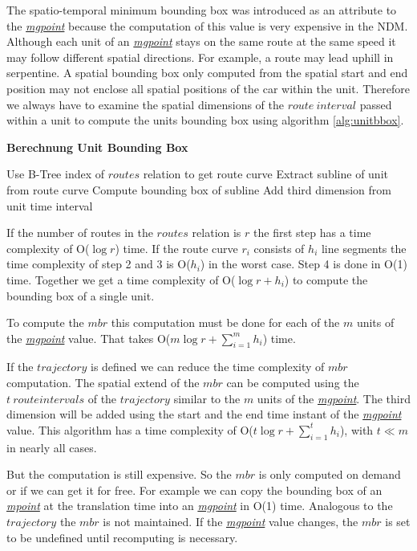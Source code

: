 \documentclass[a4paper]{article}
\newcommand{\op}[1]{\textbf{#1}}
\newcommand{\dt}[1]{\textsl{\underline{#1}}}
\begin{document}
The spatio-temporal minimum bounding box was introduced as an attribute to the
\dt{mgpoint} because the computation of this value is very expensive in the
NDM. Although each unit of an \dt{mgpoint} stays on the same route
at the same speed it may follow different spatial directions. For example, a
route may lead uphill in serpentine. A spatial bounding box only computed from
the spatial start and end position may not enclose all spatial positions of the
car within the unit. Therefore we always have to examine the spatial dimensions
of the $route\ interval$ passed within a unit to compute the units bounding box
using algorithm \ref{alg:unitbbox}.
\begin{algorithm}[H]
  \caption{\op{Berechnung Unit Bounding Box}}
  \label{alg:unitbbox}
  \begin{algorithmic}[1]
    \STATE Use B-Tree index of $routes$ relation to get route curve
    \STATE Extract subline of unit from route curve
    \STATE Compute bounding box of subline
    \STATE Add third dimension from unit time interval
  \end{algorithmic}
\end{algorithm}
If the number of routes in the $routes$ relation is $r$ the first step has a
time complexity of O($\log r$) time. If the route curve $r_i$ consists of $h_i$
line segments the time complexity of step 2 and 3 is O($h_i$) in the worst case.
Step 4 is done in O(1) time. Together we get a time complexity of
O($\log {r} + h_i$) to compute the bounding box of a single unit.

To compute the $mbr$ this computation must be done for each of the $m$ units of
the \dt{mgpoint} value. That takes O($m \log {r} + \sum_{i=1}^{m}{h_i}$) time.

If the $trajectory$ is defined we can reduce the time complexity of $mbr$
computation. The spatial extend of the $mbr$ can be computed
using the $t\ route intervals$ of the $trajectory$ similar to the $m$ units of
the \dt{mgpoint}. The third dimension will be added using the start and the end
time instant of the \dt{mgpoint} value. This algorithm has a time complexity of
O($t \log {r} + \sum_{i=1}^{t}{h_i}$), with $t \ll m$ in nearly all cases.

But the computation is still expensive. So the $mbr$ is only computed on demand
or if we can get it for free. For example we can copy
the bounding box of an \dt{mpoint} at the translation time into an \dt{mgpoint}
in O(1) time.
Analogous to the $trajectory$ the $mbr$ is not maintained. If
the \dt{mgpoint} value changes, the $mbr$ is set to be undefined until recomputing
is necessary.
\end{document}
